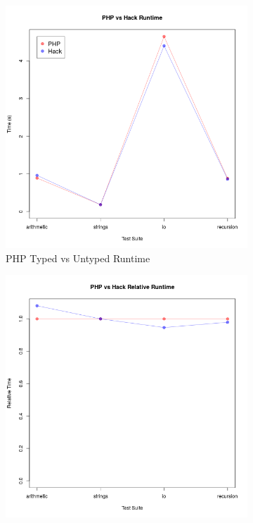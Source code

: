 \begin{figure}[H]
\centering
\begin{subfigure}{.5\textwidth}
  \centering
  \includegraphics[width=\linewidth]{../src/PHP_typed_vs_untyped.png}
  \caption{PHP Typed vs Untyped Runtime}
  \label{fig:phpHackRaw}
\end{subfigure}%
\begin{subfigure}{.5\textwidth}
  \centering
  \includegraphics[width=\linewidth]{../src/PHP_typed_vs_untyped_relative.png}

\end{subfigure}
\end{figure}
